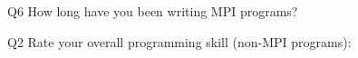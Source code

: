\begin{description}%
\item{Q6} How long have you been writing MPI programs?%
\item{Q2} Rate your overall programming skill (non-MPI programs):%
\end{description}%
